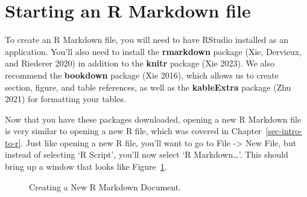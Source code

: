 \documentclass[
  letterpaper,
]{krantz}
\begin{document}
\section{Starting an R Markdown file}\label{starting-an-r-markdown-file}

To create an R Markdown file, you will need to have RStudio installed as
an application. You'll also need to install the \textbf{rmarkdown}
package (Xie, Dervieux, and Riederer 2020) in addition to the
\textbf{knitr} package (Xie 2023). We also recommend the
\textbf{bookdown} package (Xie 2016), which allows us to create section,
figure, and table references, as well as the \textbf{kableExtra} package
(Zhu 2021) for formatting your tables.

Now that you have these packages downloaded, opening a new R Markdown
file is very similar to opening a new R file, which was covered in
Chapter~\ref{sec-intro-to-r}. Just like opening a new R file, you'll
want to go to File -\textgreater{} New File, but instead of selecting `R
Script', you'll now select `R Markdown\ldots{}'. This should bring up a
window that looks like Figure~\ref{fig-new-markdown}.

\begin{figure}


\caption{\label{fig-new-markdown}Creating a New R Markdown Document.}

\end{figure}%
\end{document}
